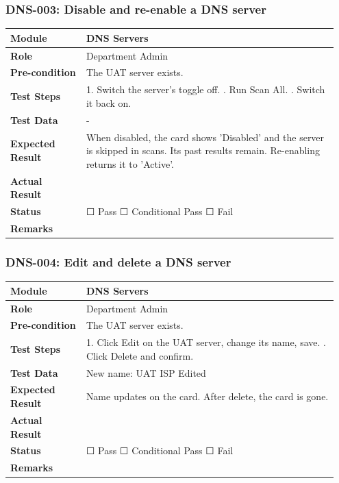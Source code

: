 \documentclass[10pt]{article}
\begin{document}
\subsubsection*{DNS-003: Disable and re-enable a DNS server}
\begin{longtable}{p{0.22\linewidth}p{0.73\linewidth}}
\hline
\textbf{Module} & DNS Servers \\ \hline
\textbf{Role} & Department Admin \\ \hline
\textbf{Pre-condition} & The UAT server exists. \\ \hline
\textbf{Test Steps} & 1. Switch the server's toggle off. \newline 2. Run Scan All. \newline 3. Switch it back on. \\ \hline
\textbf{Test Data} & - \\ \hline
\textbf{Expected Result} & When disabled, the card shows 'Disabled' and the server is skipped in scans. Its past results remain. Re-enabling returns it to 'Active'. \\ \hline
\textbf{Actual Result} & \newline \newline \\ \hline
\textbf{Status} & ☐ Pass \quad ☐ Conditional Pass \quad ☐ Fail \\ \hline
\textbf{Remarks} & \newline \\ \hline
\end{longtable}
\subsubsection*{DNS-004: Edit and delete a DNS server}
\begin{longtable}{p{0.22\linewidth}p{0.73\linewidth}}
\hline
\textbf{Module} & DNS Servers \\ \hline
\textbf{Role} & Department Admin \\ \hline
\textbf{Pre-condition} & The UAT server exists. \\ \hline
\textbf{Test Steps} & 1. Click Edit on the UAT server, change its name, save. \newline 2. Click Delete and confirm. \\ \hline
\textbf{Test Data} & New name: UAT ISP Edited \\ \hline
\textbf{Expected Result} & Name updates on the card. After delete, the card is gone. \\ \hline
\textbf{Actual Result} & \newline \newline \\ \hline
\textbf{Status} & ☐ Pass \quad ☐ Conditional Pass \quad ☐ Fail \\ \hline
\textbf{Remarks} & \newline \\ \hline
\end{longtable}
\end{document}
